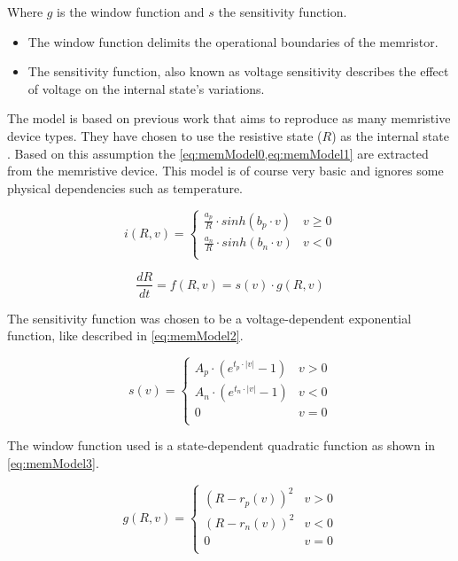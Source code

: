 Where $g$ is the window function and $s$ the sensitivity function.

\begin{itemize}
  \item The window function delimits the operational boundaries of the memristor.
  \item The sensitivity function, also known as voltage sensitivity describes the effect of voltage on the internal state's variations.
\end{itemize}

The model is based on previous work \cite{memCadenceModel} that aims to reproduce as many memristive device types. They have chosen to use the resistive state ($R$) as the internal state \cite{memModelOrigin}. Based on this assumption the \cref{eq:memModel0,eq:memModel1} are extracted from the memristive device. This model is of course very basic and ignores some physical dependencies such as temperature.

\begin{equation}\label{eq:memModel0}
  i(R,v)=
  \begin{cases}
    \frac{a_p}{R}\cdot sinh(b_p\cdot v) & v\ge 0\\
    \frac{a_n}{R}\cdot sinh(b_n\cdot v) & v<0\\
  \end{cases}
\end{equation}

\begin{equation}\label{eq:memModel1}
  \frac{dR}{dt}=f(R,v)=s(v)\cdot g(R,v)
\end{equation}

The sensitivity function was chosen to be a voltage-dependent exponential function, like described in \cref{eq:memModel2}.

\begin{equation}\label{eq:memModel2}
  s(v)=
  \begin{cases}
    A_p\cdot (e^{t_p\cdot |v|}-1)& v>0\\
    A_n\cdot (e^{t_n\cdot |v|}-1)& v<0\\
    0 &  v=0\\
  \end{cases}
\end{equation}

The window function used is a state-dependent quadratic function as shown in \cref{eq:memModel3}.

\begin{equation}\label{eq:memModel3}
  g(R,v)=
  \begin{cases}
    (R-r_p(v))^2& v>0\\
    (R-r_n(v))^2& v<0\\
    0 &  v=0\\
  \end{cases}
\end{equation}

